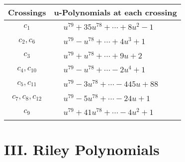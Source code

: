 \documentclass[1p]{elsarticle_modified}
\theoremstyle{definition}
\begin{document}
\begin{tabular}{m{50pt}|m{274pt}}
Crossings & \hspace{64pt}u-Polynomials at each crossing \\
\hline $$\begin{aligned}c_{1}\end{aligned}$$&$\begin{aligned}
&u^{79}+35 u^{78}+\cdots+8 u^2-1
\end{aligned}$\\
\hline $$\begin{aligned}c_{2},c_{6}\end{aligned}$$&$\begin{aligned}
&u^{79}- u^{78}+\cdots+4 u^3+1
\end{aligned}$\\
\hline $$\begin{aligned}c_{3}\end{aligned}$$&$\begin{aligned}
&u^{79}+u^{78}+\cdots+9 u+2
\end{aligned}$\\
\hline $$\begin{aligned}c_{4},c_{10}\end{aligned}$$&$\begin{aligned}
&u^{79}- u^{78}+\cdots-2 u^4+1
\end{aligned}$\\
\hline $$\begin{aligned}c_{5},c_{11}\end{aligned}$$&$\begin{aligned}
&u^{79}-3 u^{78}+\cdots-445 u+88
\end{aligned}$\\
\hline $$\begin{aligned}c_{7},c_{8},c_{12}\end{aligned}$$&$\begin{aligned}
&u^{79}-5 u^{78}+\cdots-24 u+1
\end{aligned}$\\
\hline $$\begin{aligned}c_{9}\end{aligned}$$&$\begin{aligned}
&u^{79}+41 u^{78}+\cdots-4 u^2+1
\end{aligned}$\\
\hline
\end{tabular}\newpage\renewcommand{\arraystretch}{1}
\centering \section*{ III. Riley Polynomials}
\end{document}
